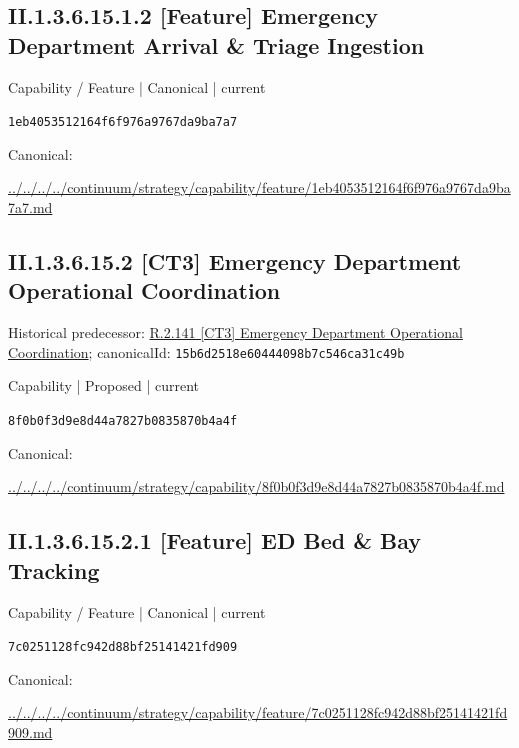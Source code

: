 \documentclass[10pt,a4paper]{article}
\begin{document}
\subsection*{II.1.3.6.15.1.2 [Feature] Emergency Department Arrival \& Triage Ingestion}
\label{element-1eb4053512164f6f976a9767da9ba7a7}
{\small Capability / Feature | Canonical | current}\par
\texttt{1eb4053512164f6f976a9767da9ba7a7}\par
Canonical: \par
{\footnotesize\url{../../../../continuum/strategy/capability/feature/1eb4053512164f6f976a9767da9ba7a7.md}}\par
\subsection*{II.1.3.6.15.2 [CT3] Emergency Department Operational Coordination}
Historical predecessor: \hyperref[element-15b6d2518e60444098b7c546ca31c49b]{R.2.141 [CT3] Emergency Department Operational Coordination}; canonicalId: \texttt{15b6d2518e60444098b7c546ca31c49b}\par
\label{element-8f0b0f3d9e8d44a7827b0835870b4a4f}
{\small Capability | Proposed | current}\par
\texttt{8f0b0f3d9e8d44a7827b0835870b4a4f}\par
Canonical: \par
{\footnotesize\url{../../../../continuum/strategy/capability/8f0b0f3d9e8d44a7827b0835870b4a4f.md}}\par
\subsection*{II.1.3.6.15.2.1 [Feature] ED Bed \& Bay Tracking}
\label{element-7c0251128fc942d88bf25141421fd909}
{\small Capability / Feature | Canonical | current}\par
\texttt{7c0251128fc942d88bf25141421fd909}\par
Canonical: \par
{\footnotesize\url{../../../../continuum/strategy/capability/feature/7c0251128fc942d88bf25141421fd909.md}}\par
\end{document}
